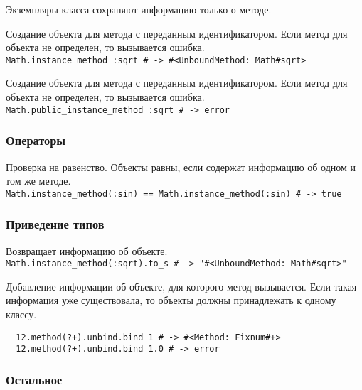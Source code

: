 Экземпляры класса сохраняют информацию только о методе.

\begin{methodlist}
  Создание объекта для метода с переданным идентификатором. Если метод для объекта не определен, то вызывается ошибка. 
  \\\verb!Math.instance_method :sqrt # -> #<UnboundMethod: Math#sqrt>!
 
  Создание объекта для метода с переданным идентификатором. Если метод для объекта не определен, то вызывается ошибка.
  \\\verb!Math.public_instance_method :sqrt # -> error!
\end{methodlist}

\subsubsection*{Операторы}

\begin{methodlist}
  Проверка на равенство. Объекты равны, если содержат информацию об одном и том же методе.
  \\\verb!Math.instance_method(:sin) == Math.instance_method(:sin) # -> true!
\end{methodlist}

\subsubsection*{Приведение типов}

\begin{methodlist}
  Возвращает информацию об объекте.
  \\\verb!Math.instance_method(:sqrt).to_s # -> "#<UnboundMethod: Math#sqrt>"!

  Добавление информации об объекте, для которого метод вызывается. Если такая информация уже существовала, то объекты должны принадлежать к одному классу.
  \begin{verbatim}
  12.method(?+).unbind.bind 1 # -> #<Method: Fixnum#+>
  12.method(?+).unbind.bind 1.0 # -> error
  \end{verbatim}  
\end{methodlist}

\subsubsection*{Остальное}

